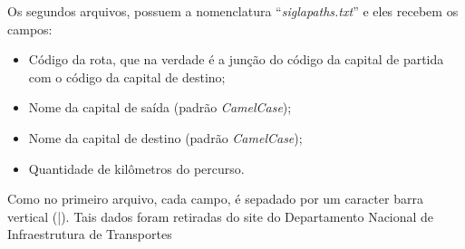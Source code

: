 Os segundos arquivos, possuem a nomenclatura ``\textit{sigla\underline{\hspace{.1in}}paths.txt}'' e eles recebem os campos:

\begin{itemize}
	\item Código da rota, que na verdade é a junção do código da capital de partida com o código da capital de destino;
	\item Nome da capital de saída (padrão \textit{CamelCase});
	\item Nome da capital de destino (padrão \textit{CamelCase});
	\item Quantidade de kilômetros do percurso.
\end{itemize}

Como no primeiro arquivo, cada campo, é sepadado por um caracter barra vertical (|). Tais dados foram retiradas do site do Departamento Nacional de Infraestrutura de Transportes \cite{DNIT}

